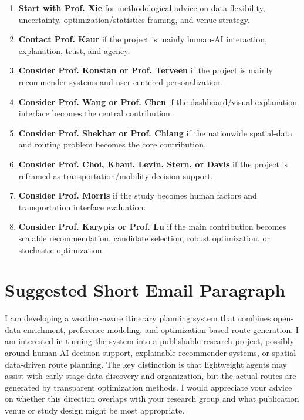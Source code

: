 \documentclass[11pt,a4paper]{article}
\begin{document}
\begin{enumerate}
    \item \textbf{Start with Prof. Xie} for methodological advice on data flexibility, uncertainty, optimization/statistics framing, and venue strategy.
    \item \textbf{Contact Prof. Kaur} if the project is mainly human-AI interaction, explanation, trust, and agency.
    \item \textbf{Consider Prof. Konstan or Prof. Terveen} if the project is mainly recommender systems and user-centered personalization.
    \item \textbf{Consider Prof. Wang or Prof. Chen} if the dashboard/visual explanation interface becomes the central contribution.
    \item \textbf{Consider Prof. Shekhar or Prof. Chiang} if the nationwide spatial-data and routing problem becomes the core contribution.
    \item \textbf{Consider Prof. Choi, Khani, Levin, Stern, or Davis} if the project is reframed as transportation/mobility decision support.
    \item \textbf{Consider Prof. Morris} if the study becomes human factors and transportation interface evaluation.
    \item \textbf{Consider Prof. Karypis or Prof. Lu} if the main contribution becomes scalable recommendation, candidate selection, robust optimization, or stochastic optimization.
\end{enumerate}

\section*{Suggested Short Email Paragraph}

\noindent I am developing a weather-aware itinerary planning system that combines open-data enrichment, preference modeling, and optimization-based route generation. I am interested in turning the system into a publishable research project, possibly around human-AI decision support, explainable recommender systems, or spatial data-driven route planning. The key distinction is that lightweight agents may assist with early-stage data discovery and organization, but the actual routes are generated by transparent optimization methods. I would appreciate your advice on whether this direction overlaps with your research group and what publication venue or study design might be most appropriate.
\end{document}

